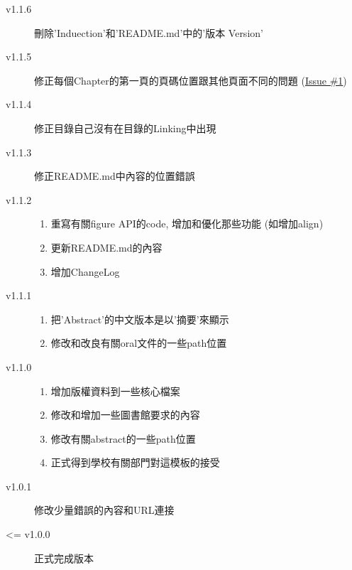 \begin{description}
  \item[v1.1.6] 刪除'Induection'和'README.md'中的'版本 Version'

  \item[v1.1.5] 修正每個Chapter的第一頁的頁碼位置跟其他頁面不同的問題 (\href{https://github.com/wengan-li/ncku-thesis-template-latex/issues/1}{Issue \#1})

  \item[v1.1.4] 修正目錄自己沒有在目錄的Linking中出現

  \item[v1.1.3] 修正README.md中內容的位置錯誤

  \item[v1.1.2] \hfill
    \begin{enumerate}
      \item 重寫有關figure API的code, 增加和優化那些功能 (如增加align)
      \item 更新README.md的內容
      \item 增加ChangeLog
    \end{enumerate}

  \item[v1.1.1] \hfill
    \begin{enumerate}
      \item 把'Abstract'的中文版本是以'摘要'來顯示
      \item 修改和改良有關oral文件的一些path位置
    \end{enumerate}

  \item[v1.1.0] \hfill
    \begin{enumerate}
      \item 增加版權資料到一些核心檔案
      \item 修改和增加一些圖書館要求的內容
      \item 修改有關abstract的一些path位置
      \item 正式得到學校有關部門對這模板的接受
    \end{enumerate}

  \item[v1.0.1] 修改少量錯誤的內容和URL連接

  \item[<= v1.0.0] 正式完成版本
\end{description}

